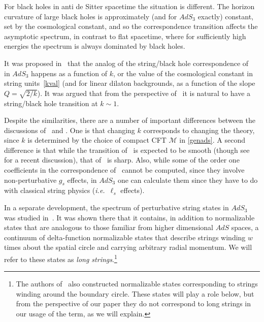 \documentclass[12pt]{article}
\def\ie{{i.e.}}
\def\lstr{\ell_{\textit{s}}}
\numberwithin{equation}{section}
\def\cM{\mathcal {M}} \def\cN{\mathcal {N}} \def\cO{\mathcal {O}}
\def\ie{{\it i.e.}}
\def\ie{{\it i.e.}}
\begin{document}
For black holes in anti de Sitter spacetime the situation is different. The horizon curvature of large black holes is approximately (and for $AdS_3$ exactly) constant, set by the cosmological constant, and so the correspondence transition affects the asymptotic spectrum, in contrast to flat spacetime, where for sufficiently high energies the spectrum is always dominated by black holes. 

It was proposed in~ that the analog of the string/black hole correspondence of~ in $AdS_3$ happens as a function of $k$, or the value of the cosmological constant in string units~\eqref{kval} (and for linear dilaton backgrounds, as a function of the slope $Q=\sqrt{2/k}$). It was argued that from the perspective of~ it is natural to have a string/black hole transition at $k\sim 1$. 


Despite the similarities, there are a number of important differences between the discussions of~ and . One is that changing $k$ corresponds to changing the theory, since $k$ is determined by the choice of compact CFT $\cM$ in \eqref{genads}.  A second difference is that while the transition of~ is expected to be smooth (though see~ for a recent discussion), 
that of~ is sharp. Also, while some of the order one coefficients in the correspondence of~ cannot be computed, since they involve non-perturbative $g_s$ effects, in $AdS_3$ one can calculate them since they have to do with classical string physics (\ie\ $\lstr$ effects).  


In a separate development, the spectrum of perturbative string states in $AdS_3$ was studied in~.  It was shown there that it contains, in addition to normalizable states that are analogous to those familiar from higher dimensional $AdS$ spaces, a continuum of delta-function normalizable states that describe strings winding $w$ times about the spatial circle and carrying arbitrary radial momentum.  We will refer to these states as {\it long strings}.\footnote{The authors of~ also constructed normalizable states corresponding to strings winding around the boundary circle. These states will play a role below, but from the perspective of our paper they do not correspond to long strings in our usage of the term, as we will explain.}  
\end{document}
